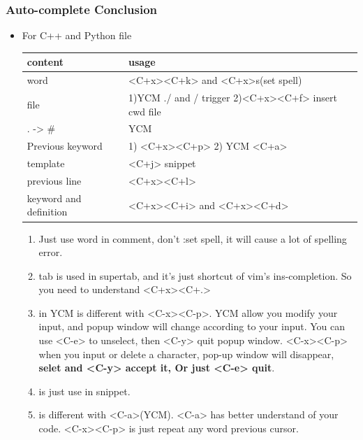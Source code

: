 \documentclass[a4paper,12pt,twoside]{book}
\begin{document}
\subsubsection{Auto-complete Conclusion}
\begin{itemize}
		\item For C++ and Python file
\begin{tabular}{p{}|p{}}
\hline 
content  & usage \\ 

\hline 
word & <C+x><C+k> and <C+x>s(set spell)\\ 

\hline 
file & 1)YCM ./ and / trigger 2)<C+x><C+f> insert cwd file  \\ 

\hline 
. -> \# & YCM \\
\hline
Previous keyword & 1) <C+x><C+p> 2) YCM <C+a> \\

\hline 
template & <C+j> snippet\\

\hline
previous line & <C+x><C+l> \\

\hline
keyword and definition & <C+x><C+i> and <C+x><C+d> \\

\hline
\end{tabular}
\begin{enumerate}
		\item Just use word in comment, don't :set spell, it will cause a lot of spelling error. 

		\item tab is used in supertab, and it's just shortcut of vim's ins-completion. So you need to understand <C+x><C+.>  

		\item <C-a> in YCM is different with <C-x><C-p>. YCM allow you modify your input, and popup window will change according to your input. You can use <C-e> to unselect, then <C-y> quit popup window. <C-x><C-p> when you input or delete a character, pop-up window will disappear, \textbf{selet and <C-y> accept it, Or just <C-e> quit}. 

		\item <C-j> is just use in snippet.

		\item <C-x><C-p> is different with <C-a>(YCM). <C-a> has better understand of your code. <C-x><C-p> is just repeat any word previous cursor.


\end{enumerate}
\end{itemize}
\end{document}
